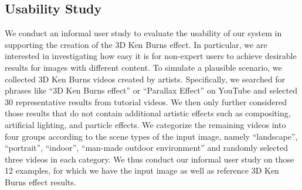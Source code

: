 \documentclass[acmtog,authorversion]{acmart}
\begin{document}
\subsection{Usability Study}
\label{sec:usability}

We conduct an informal user study to evaluate the usability of our system in supporting the creation of the 3D Ken Burns effect. In particular, we are interested in investigating how easy it is for non-expert users to achieve desirable results for images with different content. To simulate a plausible scenario, we collected 3D Ken Burns videos created by artists. Specifically, we searched for phrases like ``3D Ken Burns effect'' or ``Parallax Effect'' on YouTube and selected 30 representative results from tutorial videos. We then only further considered those results that do not contain additional artistic effects such as compositing, artificial lighting, and particle effects. We categorize the remaining videos into four groups according to the scene types of the input image, namely ``landscape'', ``portrait'', ``indoor'', ``man-made outdoor environment'' and randomly selected three videos in each category. We thus conduct our informal user study on those 12 examples, for which we have the input image as well as reference 3D Ken Burns effect results.
\end{document}
